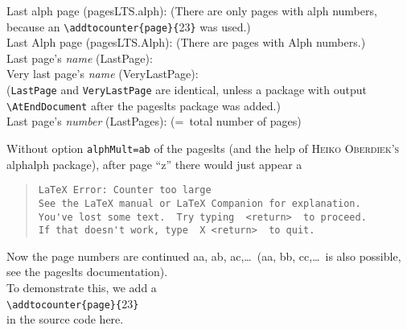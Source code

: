 \documentclass[british]{article}
\def\pagesLTSexamplealph{23}
\begin{document}
\noindent Last alph page (pagesLTS.alph): 
(There are only  pages with alph numbers,
because an \verb|\addtocounter{page}{|\pagesLTSexamplealph\verb|}| was used.)\\

\noindent Last Alph page (pagesLTS.Alph): 
(There are  pages with Alph numbers.)\\

\noindent Last page's \textit{name} (LastPage): \\

\noindent Very last page's \textit{name} (VeryLastPage): \\
(\texttt{LastPage} and \texttt{VeryLastPage} are identical, unless
a package with output \linebreak
\verb|\AtEndDocument| after the \textsf{pageslts} package was added.)\\

\noindent Last page's \textit{number} (LastPages): 
(=~total number of pages)\\

\lipsum[1-4]

\newpage

Without option \texttt{alphMult=ab} of the \textsf{pageslts} (and the help of
\textsc{Heiko Oberdiek's} \textsf{alphalph} package), after page
\textquotedblleft z\textquotedblright{} there would just appear a
\begin{quote}
\begin{verbatim}
LaTeX Error: Counter too large
See the LaTeX manual or LaTeX Companion for explanation.
You've lost some text.  Try typing  <return>  to proceed.
If that doesn't work, type  X <return>  to quit.
\end{verbatim}
\end{quote}
Now the page numbers are continued aa, ab, ac,\ldots\ (aa, bb, cc,\ldots\ is
also possible, see the \textsf{pageslts} documentation).\\
To demonstrate this, we add a\\
\verb|\addtocounter{page}{|\pagesLTSexamplealph\verb|}|\\
in the source code here.

\addtocounter{page}{\pagesLTSexamplealph}

\bigskip

\lipsum[1-18]
\end{document}
